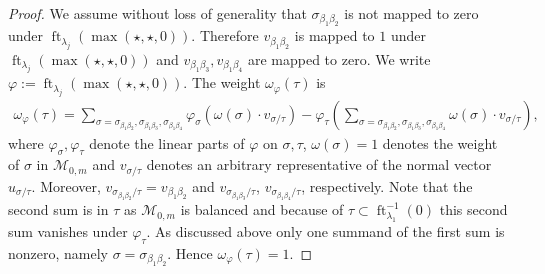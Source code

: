 \documentclass[11pt,reqno,a4]{amsart}
\theoremstyle{dotless}
\theoremstyle{definition}
\newcommand{\ft}{\operatorname{ft}}
\begin{document}
\begin{proof}
\noindent
We assume without loss of generality that $\sigma_{\beta_1\beta_2}$ is not mapped to zero under $\ft_{\lambda_j}\left(\max(\star,\star,0)\right)$. Therefore $v_{\beta_1\beta_2}$ is mapped to $1$ under $\ft_{\lambda_j}\left(\max(\star,\star,0)\right)$ and $v_{\beta_1\beta_3},v_{\beta_1\beta_4}$ are mapped to zero. We write $\varphi:=\ft_{\lambda_j}\left(\max(\star,\star,0)\right)$. The weight $\omega_\varphi(\tau)$ is 
\begin{align*}
\omega_\varphi(\tau)=\sum_{\sigma=\sigma_{\beta_1\beta_2},\sigma_{\beta_1\beta_3},\sigma_{\beta_1\beta_4}}\varphi_\sigma\left(\omega(\sigma)\cdot v_{\sigma/\tau}\right)-
\varphi_{\tau}\left( \sum_{\sigma=\sigma_{\beta_1\beta_2},\sigma_{\beta_1\beta_3},\sigma_{\beta_1\beta_4}} \omega(\sigma)\cdot v_{\sigma/\tau} \right),
\end{align*}
where $\varphi_\sigma,\varphi_\tau$ denote the linear parts of $\varphi$ on $\sigma,\tau$, $\omega(\sigma)=1$ denotes the weight of $\sigma$ in $\mathcal{M}_{0,m}$ and $v_{\sigma/\tau}$ denotes an arbitrary representative of the normal vector $u_{\sigma/\tau}$. Moreover, $v_{\sigma_{\beta_1\beta_2}/\tau}=v_{\beta_1\beta_2}$ and $v_{\sigma_{\beta_1\beta_3}/\tau}$, $v_{\sigma_{\beta_1\beta_4}/\tau}$, respectively. Note that the second sum is in $\tau$ as $\mathcal{M}_{0,m}$ is balanced and because of $\tau\subset\ft^{-1}_{\lambda_1}\left( 0 \right)$ this second sum vanishes under $\varphi_\tau$. As discussed above only one summand of the first sum is nonzero, namely $\sigma=\sigma_{\beta_1\beta_2}$. Hence $\omega_\varphi(\tau)=1$.


\end{proof}
\end{document}
